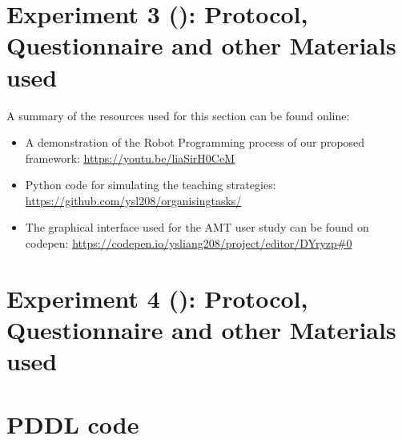 \chapter{Experiment 3 (): Protocol, Questionnaire and other Materials used}
\label{app:exp3}
A summary of the resources used for this section can be found online:
\begin{itemize}
	\item A demonstration of the Robot Programming process of our proposed framework: \url{https://youtu.be/liaSirH0CeM}
	\item Python code for simulating the teaching strategies: \url{https://github.com/ysl208/organisingtasks/}
	\item The graphical interface used for the AMT user study can be found on codepen:
	\url{https://codepen.io/ysliang208/project/editor/DYryzp#0}
\end{itemize}
%
%


\chapter{Experiment 4 (): Protocol, Questionnaire and other Materials used}
\label{app:exp4}
%
%
%
%
%

\chapter{PDDL code}\label{app:pddl}    
